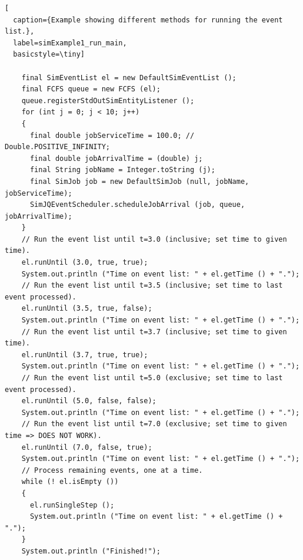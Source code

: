 \documentclass[12pt]{book}
\begin{document}
\begin{lstfloat}
\begin{lstlisting}[
  caption={Example showing different methods for running the event list.},
  label=simExample1_run_main,
  basicstyle=\tiny]

    final SimEventList el = new DefaultSimEventList ();
    final FCFS queue = new FCFS (el);
    queue.registerStdOutSimEntityListener ();
    for (int j = 0; j < 10; j++)
    {
      final double jobServiceTime = 100.0; // Double.POSITIVE_INFINITY;
      final double jobArrivalTime = (double) j;
      final String jobName = Integer.toString (j);
      final SimJob job = new DefaultSimJob (null, jobName, jobServiceTime);
      SimJQEventScheduler.scheduleJobArrival (job, queue, jobArrivalTime);
    }
    // Run the event list until t=3.0 (inclusive; set time to given time).
    el.runUntil (3.0, true, true);
    System.out.println ("Time on event list: " + el.getTime () + ".");
    // Run the event list until t=3.5 (inclusive; set time to last event processed).
    el.runUntil (3.5, true, false);
    System.out.println ("Time on event list: " + el.getTime () + ".");
    // Run the event list until t=3.7 (inclusive; set time to given time).
    el.runUntil (3.7, true, true);
    System.out.println ("Time on event list: " + el.getTime () + ".");
    // Run the event list until t=5.0 (exclusive; set time to last event processed).
    el.runUntil (5.0, false, false);
    System.out.println ("Time on event list: " + el.getTime () + ".");
    // Run the event list until t=7.0 (exclusive; set time to given time => DOES NOT WORK).
    el.runUntil (7.0, false, true);
    System.out.println ("Time on event list: " + el.getTime () + ".");
    // Process remaining events, one at a time.
    while (! el.isEmpty ())
    {
      el.runSingleStep ();
      System.out.println ("Time on event list: " + el.getTime () + ".");
    }
    System.out.println ("Finished!");

\end{lstlisting}
\end{lstfloat}
\end{document}
